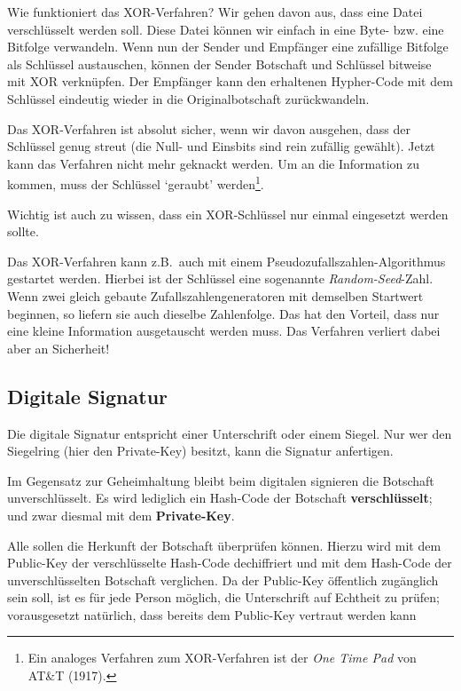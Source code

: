 Wie funktioniert das XOR-Verfahren? Wir gehen davon aus, dass eine
Datei verschlüsselt werden soll. Diese Datei können wir einfach
in eine Byte- bzw. eine Bitfolge verwandeln. Wenn nun der Sender
und Empfänger eine zufällige Bitfolge als Schlüssel austauschen,
können der Sender Botschaft und Schlüssel bitweise mit XOR verknüpfen.
Der Empfänger kann den erhaltenen Hypher-Code mit dem Schlüssel
eindeutig wieder in die Originalbotschaft zurückwandeln.

Das XOR-Verfahren ist absolut sicher, wenn wir davon ausgehen,
dass der Schlüssel genug streut (die Null- und Einsbits sind rein
zufällig gewählt). Jetzt kann das Verfahren nicht mehr geknackt
werden. Um an die Information zu kommen, muss der Schlüssel
`geraubt' werden\footnote{Ein analoges Verfahren zum XOR-Verfahren
ist der \emph{One Time Pad} von AT\&T (1917).}.

Wichtig ist auch zu wissen, dass ein XOR-Schlüssel nur einmal
eingesetzt werden sollte.

Das XOR-Verfahren kann z.B.~auch mit einem Pseudozufallszahlen-Algorithmus
gestartet werden. Hierbei ist der Schlüssel eine sogenannte
\emph{Random-Seed}-Zahl. Wenn zwei gleich gebaute Zufallszahlengeneratoren
mit demselben Startwert beginnen, so liefern sie auch dieselbe
Zahlenfolge. Das hat den Vorteil, dass nur eine kleine Information
ausgetauscht werden muss. Das Verfahren verliert dabei aber an Sicherheit!

\subsection{Digitale Signatur}
\label{subsec:digitale-signatur}

Die digitale Signatur entspricht einer Unterschrift oder einem Siegel.
Nur wer den Siegelring (hier den Private-Key) besitzt, kann die Signatur
anfertigen.

Im Gegensatz zur Geheimhaltung bleibt beim digitalen signieren die
Botschaft unverschlüsselt. Es wird lediglich ein Hash-Code
der Botschaft \textbf{verschlüsselt}; und zwar diesmal mit dem
\textbf{Private-Key}.

Alle sollen die Herkunft der Botschaft überprüfen können. Hierzu wird
mit dem Public-Key der verschlüsselte Hash-Code dechiffriert und mit
dem Hash-Code der unverschlüsselten Botschaft verglichen. Da der
Public-Key öffentlich zugänglich sein soll, ist es für jede Person
möglich, die Unterschrift auf Echtheit zu prüfen; vorausgesetzt
natürlich, dass bereits dem Public-Key vertraut werden kann


